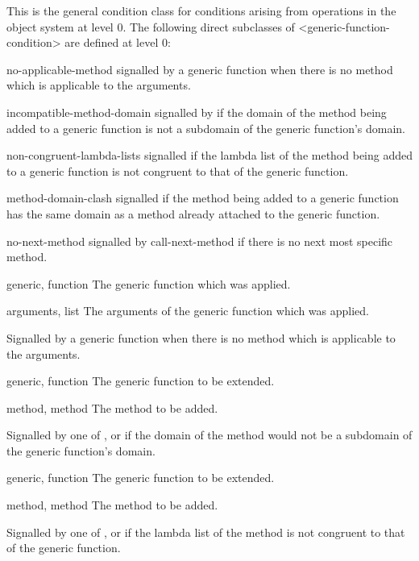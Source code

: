 \begin{optDefinition}
%
This is the general condition class for conditions arising from operations in
the object system at level 0. The following direct subclasses of
<generic-function-condition> are defined at level 0:
%
\begin{subclasses}
    \item[no-applicable-method] signalled by a generic function when there is
    no method which is applicable to the arguments.
    \item[incompatible-method-domain] signalled by if the domain of the method
    being added to a generic function is not a subdomain of the generic
    function's domain.
    \item[non-congruent-lambda-lists] signalled if the lambda list of the
    method being added to a generic function is not congruent to that of the
    generic function.
    \item[method-domain-clash] signalled if the method being added to a
    generic function has the same domain as a method already attached to the
    generic function.
    \item[no-next-method] signalled by call-next-method if there is no next
    most specific method.
\end{subclasses}
%
%
\begin{initoptions}
    \item[generic, function] The generic function which was applied.
    \item[arguments, list] The arguments of the generic function which was applied.
\end{initoptions}
%
\remarks%
Signalled by a generic function when there is no method which is
applicable to the arguments.

%
\begin{initoptions}
    \item[generic, function] The generic function to be extended.
    \item[method, method] The method to be added.
\end{initoptions}
%
\remarks%
Signalled by one of ,  or
 if the domain of the method would not be a subdomain
of the generic function's domain.

%
\begin{initoptions}
    \item[generic, function] The generic function to be extended.
    \item[method, method] The method to be added.
\end{initoptions}
%
\remarks%
Signalled by one of ,  or
 if the lambda list of the method is not congruent to
that of the generic function.


\end{optDefinition}
